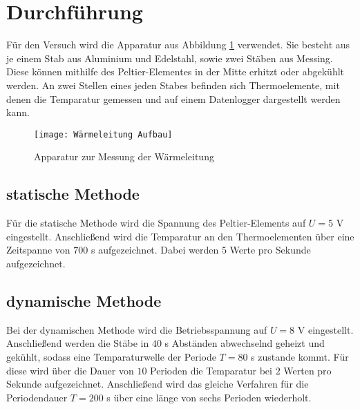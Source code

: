 \section{Durchführung}
Für den Versuch wird die Apparatur aus Abbildung \ref{fig:Aufbau} verwendet. Sie besteht aus je einem Stab aus Aluminium und Edelstahl, sowie zwei Stäben aus Messing. Diese können mithilfe des Peltier-Elementes in der Mitte erhitzt oder abgekühlt werden. An zwei Stellen eines jeden Stabes befinden sich Thermoelemente, mit denen 
die Temparatur gemessen und auf einem Datenlogger dargestellt werden kann.
\begin{figure} [h]
    \centering
    \texttt{[image: Wärmeleitung Aufbau]}
    \caption{Apparatur zur Messung der Wärmeleitung}
    \label{fig:Aufbau}
 \end{figure}
\subsection{statische Methode}
Für die statische Methode wird die Spannung des Peltier-Elements auf $U=5$ V eingestellt. Anschließend wird die Temparatur an den Thermoelementen über eine Zeitspanne von $700$ s aufgezeichnet. Dabei werden $5$ Werte pro Sekunde aufgezeichnet.
\subsection{dynamische Methode}
Bei der dynamischen Methode wird die Betriebsspannung auf $U=8$ V eingestellt. Anschließend werden die Stäbe in $40$ s Abständen abwechselnd geheizt und gekühlt, sodass eine Temparaturwelle der Periode $T=80$ s zustande kommt. Für diese wird über die Dauer von $10$ Perioden die Temparatur bei $2$ Werten pro Sekunde aufgezeichnet. Anschließend wird das gleiche Verfahren für die Periodendauer $T=200$ s über eine länge von sechs Perioden wiederholt.
